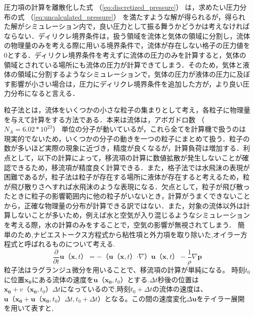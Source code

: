 \documentclass[a4j,12pt]{jreport}
\begin{document}
圧力項の計算を離散化した式 （\ref{eq:discretized_pressure}） は，求めたい圧力分布の式 （\ref{eq:uncalculated_pressure}） を満たすような解が得られるが，得られた解がシミュレーション内で，良い圧力として振る舞うかどうかは考えなければならない．ディリクレ境界条件は，扱う領域を流体と気体の領域に分割し，流体の物理量のみを考える際に用いる境界条件で，流体が存在しない格子の圧力値を$0$とする．ディリクレ境界条件を考えずに流体の圧力のみを計算すると，気体の領域とされている場所にも流体の圧力が計算できてしまう．そのため，気体と液体の領域に分割するようなシミュレーションで，気体の圧力が液体の圧力に及ぼす影響が小さい場合は，圧力にディリクレ境界条件を追加した方が，より良い圧力分布になると言える．

粒子法とは，流体をいくつかの小さな粒子の集まりとして考え，各粒子に物理量を与えて計算をする方法である．本来は流体は，アボガドロ数 （$N_A = 6.02*10^{23}$） 単位の分子が動いているが，これら全てを計算機で扱うのは現実的でないため，いくつかの分子の動きを一つの粒子にまとめて扱う．粒子の数が多いほど実際の現象に近づき，精度が良くなるが，計算負荷は増加する．利点として，以下の計算によって，移流項の計算に数値拡散が発生しないことが確認できるため，移流項が精度良く計算できる．また，格子法では水飛沫の表現が困難であるが，粒子法は粒子が存在する場所に液体が存在すると考えるため，粒が飛び散りさへすれば水飛沫のような表現になる．欠点として，粒子が飛び散ったときに粒子の影響範囲内に他の粒子がいないとき，計算がうまくできないことから，正確な物理量の分布が計算できる訳ではない．また，対象の流体以外は計算しないことが多いため，例えば水と空気が入り混じるようなシミュレーションを考える際，水の計算のみをすることで，空気の影響が無視されてしまう．
簡単のため,ナビエストークス方程式から粘性項と外力項を取り除いた,オイラー方程式と呼ばれるものについて考える.
$$\frac{\partial}{\partial t}\bm{u} （\bm{x},t）  = - （\bm{u} （\bm{x},t） \boldsymbol{\cdot}\nabla） \bm{u} （\bm{x},t）  - \frac{1}{\rho}\nabla \bm{p}$$
粒子法はラグランジュ微分を用いることで、移流項の計算が単純になる。
時刻$t_0$に位置$\bm{x_0}$にある流体の速度を$\bm{u} （\bm{x_0},t_0） $とする.$\varDelta t$秒後の位置は$\bm{x_0}+v （\bm{x_0},t_0） \varDelta t$になっているので,時刻$t_0+\varDelta t$の流体の速度は、$\bm{u} （\bm{x_0}+\bm{u} （\bm{x_0},t_0） \varDelta t,t_0+\varDelta t） $となる。この間の速度変化$\varDelta \bm{u}$をテイラー展開を用いて表すと,
\end{document}
